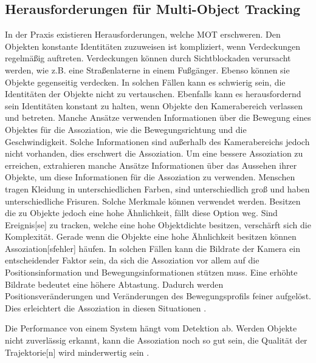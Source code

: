 \subsection{Herausforderungen für Multi-Object Tracking} \label{sec:MOT Herausforderungen}
In der Praxis existieren Herausforderungen, welche \gls{MOT} erschweren. Den Objekten konstante Identitäten zuzuweisen ist kompliziert, wenn Verdeckungen regelmäßig auftreten. Verdeckungen können durch Sichtblockaden verursacht werden, wie z.B. eine Straßenlaterne in einem Fußgänger. Ebenso können sie Objekte gegenseitig verdecken. In solchen Fällen kann es schwierig sein, die Identitäten der Objekte nicht zu vertauschen. Ebenfalls kann es herausfordernd sein Identitäten konstant zu halten, wenn Objekte den Kamerabereich verlassen und betreten. Manche Ansätze verwenden Informationen über die Bewegung eines Objektes für die  \gls{Assoziation}, wie die Bewegungsrichtung und die Geschwindigkeit. Solche Informationen sind außerhalb des Kamerabereichs jedoch nicht vorhanden, dies erschwert die \gls{Assoziation}. Um eine bessere \gls{Assoziation} zu erreichen, extrahieren manche Ansätze Informationen über das Aussehen ihrer Objekte, um diese Informationen für die \gls{Assoziation} zu verwenden. Menschen tragen Kleidung in unterschiedlichen Farben, sind unterschiedlich groß und haben unterschiedliche Frisuren. Solche Merkmale können verwendet werden. Besitzen die zu  Objekte jedoch eine hohe Ähnlichkeit, fällt diese Option weg. Sind \gls{Ereignis}[se] zu tracken, welche eine hohe Objektdichte besitzen, verschärft sich die Komplexität. Gerade wenn die Objekte eine hohe Ähnlichkeit besitzen können \gls{Assoziation}[sfehler] häufen. In solchen Fällen kann die Bildrate der Kamera ein entscheidender Faktor sein, da sich die \gls{Assoziation} vor allem auf die Positionsinformation und Bewegungsinformationen stützen muss. Eine erhöhte Bildrate bedeutet eine höhere Abtastung. Dadurch werden Positionsveränderungen und Veränderungen des Bewegungsprofils feiner aufgelöst. Dies erleichtert die \gls{Assoziation} in diesen Situationen \cite{Luo.2022, Feng.2022}. \par

Die Performance von einem  System hängt vom \gls{Detektion} ab. Werden Objekte nicht zuverlässig erkannt, kann die \gls{Assoziation} noch so gut sein, die Qualität der \gls{Trajektorie}[n] wird minderwertig sein \cite{Luo.2022}. 


